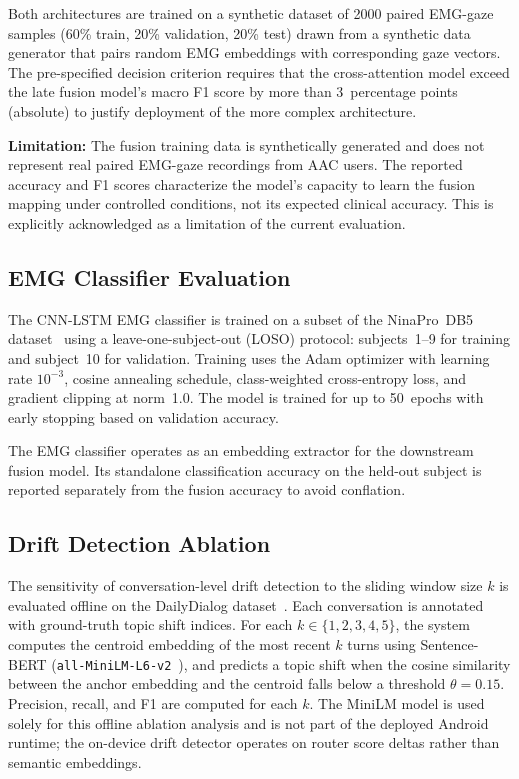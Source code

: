 \documentclass[journal]{IEEEtran}
\begin{document}
Both architectures are trained on a synthetic dataset of 2000 paired EMG-gaze samples (60\% train, 20\% validation, 20\% test) drawn from a synthetic data generator that pairs random EMG embeddings with corresponding gaze vectors. The pre-specified decision criterion requires that the cross-attention model exceed the late fusion model's macro F1 score by more than 3~percentage points (absolute) to justify deployment of the more complex architecture.

\textbf{Limitation:} The fusion training data is synthetically generated and does not represent real paired EMG-gaze recordings from AAC users. The reported accuracy and F1 scores characterize the model's capacity to learn the fusion mapping under controlled conditions, not its expected clinical accuracy. This is explicitly acknowledged as a limitation of the current evaluation.

\subsection{EMG Classifier Evaluation}
\label{sec:emg_eval}

The CNN-LSTM EMG classifier is trained on a subset of the NinaPro~DB5 dataset~\cite{ninapro} using a leave-one-subject-out (LOSO) protocol: subjects~1--9 for training and subject~10 for validation. Training uses the Adam optimizer with learning rate $10^{-3}$, cosine annealing schedule, class-weighted cross-entropy loss, and gradient clipping at norm~1.0. The model is trained for up to 50~epochs with early stopping based on validation accuracy.

The EMG classifier operates as an embedding extractor for the downstream fusion model. Its standalone classification accuracy on the held-out subject is reported separately from the fusion accuracy to avoid conflation.

\subsection{Drift Detection Ablation}
\label{sec:drift_eval}

The sensitivity of conversation-level drift detection to the sliding window size $k$ is evaluated offline on the DailyDialog dataset~\cite{dailydialog}. Each conversation is annotated with ground-truth topic shift indices. For each $k \in \{1, 2, 3, 4, 5\}$, the system computes the centroid embedding of the most recent $k$ turns using Sentence-BERT (\texttt{all-MiniLM-L6-v2}~\cite{minilm}), and predicts a topic shift when the cosine similarity between the anchor embedding and the centroid falls below a threshold $\theta = 0.15$. Precision, recall, and F1 are computed for each $k$. The MiniLM model is used solely for this offline ablation analysis and is not part of the deployed Android runtime; the on-device drift detector operates on router score deltas rather than semantic embeddings.
\end{document}
